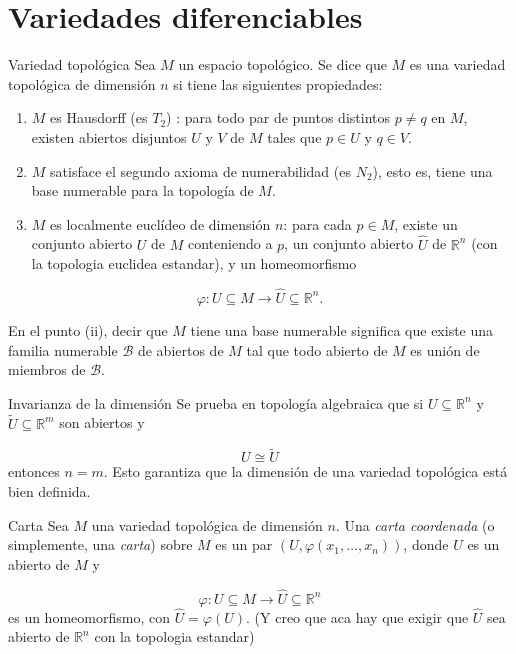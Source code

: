 \section{Variedades diferenciables}
\begin{bookdefinition}{Variedad topológica}
Sea $M$ un espacio topológico. Se dice que $M$ es una variedad topológica de dimensión $n$ si tiene las siguientes propiedades:

\begin{enumerate}
\item $M$ es Hausdorff (es $T_{2}$) : para todo par de puntos distintos $p\neq q$ en $M$, existen abiertos disjuntos $U$ y $V$ de $M$ tales que $p\in U$ y $q\in V$.
\item $M$ satisface el segundo axioma de numerabilidad (es $N_2$), esto es, tiene una base numerable para la topología de $M$.
\item $M$ es localmente euclídeo de dimensión $n$: para cada $p\in M$, existe un conjunto abierto $U$ de $M$ conteniendo a $p$, un conjunto abierto $\widehat U$ de $\mathbb{R}^n$ (con la topologia euclidea estandar), y un homeomorfismo
\end{enumerate}
\[
\varphi:U\subseteq M\longrightarrow \widehat U\subseteq \mathbb{R}^n.
\]
\end{bookdefinition}
\label{blk:5bf2ca}
\begin{bookremark}{}
En el punto (ii), decir que $M$ tiene una base numerable significa que existe una familia numerable $\mathcal{B}$ de abiertos de $M$ tal que todo abierto de $M$ es unión de miembros de $\mathcal{B}$.

\end{bookremark}
\begin{bookremark}{Invarianza de la dimensión}
Se prueba en topología algebraica que si $U\subseteq \mathbb{R}^n$ y $\widetilde U\subseteq \mathbb{R}^m$ son abiertos y

\[
U \cong \widetilde U
\]
entonces $n=m$. Esto garantiza que la dimensión de una variedad topológica está bien definida.

\end{bookremark}
\begin{bookdefinition}{Carta}
Sea $M$ una variedad topológica de dimensión $n$. Una \emph{carta coordenada} (o simplemente, una \emph{carta}) sobre $M$ es un par $(U,\varphi(x_1,\dots,x_n))$, donde $U$ es un abierto de $M$ y

\[
\varphi:U\subseteq M\longrightarrow \widehat U\subseteq\mathbb{R}^n
\]
es un homeomorfismo, con $\widehat U=\varphi(U)$. (Y creo que aca hay que exigir que $\widehat{U}$ sea abierto de $\mathbb{R}^{n}$ con la topologia estandar)

\end{bookdefinition}
